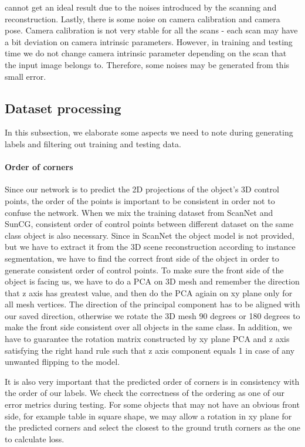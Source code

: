 cannot get an ideal result due to the noises introduced by the scanning and reconstruction. Lastly, there is some noise on camera calibration and camera pose. Camera calibration is not very stable for all the scans - each scan may have a bit deviation on camera intrinsic parameters. However, in training and testing time we do not change camera intrinsic parameter depending on the scan that the input image belongs to. Therefore, some noises may be generated from this small error.
 
\subsection{Dataset processing}

In this subsection, we elaborate some aspects we need to note during generating labels and filtering out training and testing data.

\paragraph{Order of corners}
Since our network is to predict the 2D projections of the object's 3D control points, the order of the points is important to be consistent in order not to confuse the network. When we mix the training dataset from ScanNet and SunCG, consistent order of control points between different dataset on the same class object is also necessary. Since in ScanNet the object model is not provided, but we have to extract it from the 3D scene reconstruction according to instance segmentation, we have to find the correct front side of the object in order to generate consistent order of control points. To make sure the front side of the object is facing us, we have to do a PCA on 3D mesh and remember the direction that z axis has greatest value, and then do the PCA agiain on xy plane only for all mesh vertices. The direction of the principal component has to be aligned with our saved direction, otherwise we rotate the 3D mesh 90 degrees or 180 degrees to make the front side consistent over all objects in the same class. In addition, we have to guarantee the rotation matrix constructed by xy plane PCA and z axis satisfying the right hand rule such that z axis component equals 1 in case of any unwanted flipping to the model.

It is also very important that the predicted order of corners is in consistency with the order of our labels. We check the correctness of the ordering as one of our error metrics during testing. For some objects that may not have an obvious front side, for example table in square shape, we may allow a rotation in xy plane for the predicted corners and select the closest to the ground truth corners as the one to calculate loss.

